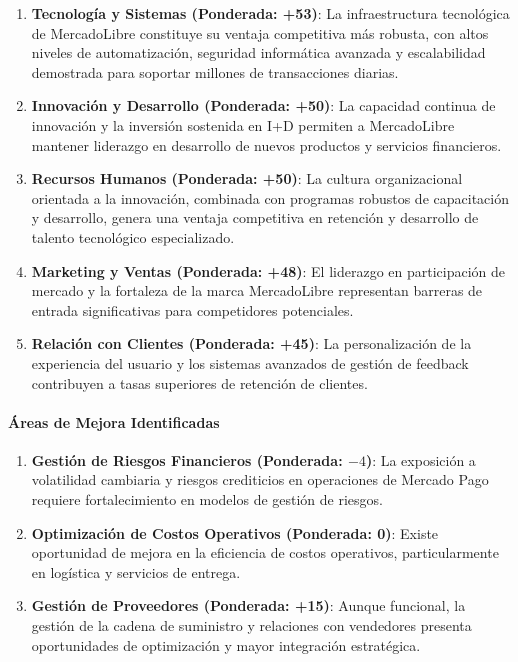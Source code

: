 \begin{enumerate}
\item \textbf{Tecnología y Sistemas (Ponderada: +53)}: La infraestructura tecnológica de MercadoLibre constituye su ventaja competitiva más robusta, con altos niveles de automatización, seguridad informática avanzada y escalabilidad demostrada para soportar millones de transacciones diarias.

\item \textbf{Innovación y Desarrollo (Ponderada: +50)}: La capacidad continua de innovación y la inversión sostenida en I+D permiten a MercadoLibre mantener liderazgo en desarrollo de nuevos productos y servicios financieros.

\item \textbf{Recursos Humanos (Ponderada: +50)}: La cultura organizacional orientada a la innovación, combinada con programas robustos de capacitación y desarrollo, genera una ventaja competitiva en retención y desarrollo de talento tecnológico especializado.

\item \textbf{Marketing y Ventas (Ponderada: +48)}: El liderazgo en participación de mercado y la fortaleza de la marca MercadoLibre representan barreras de entrada significativas para competidores potenciales.

\item \textbf{Relación con Clientes (Ponderada: +45)}: La personalización de la experiencia del usuario y los sistemas avanzados de gestión de feedback contribuyen a tasas superiores de retención de clientes.
\end{enumerate}

\paragraph{Áreas de Mejora Identificadas}

\begin{enumerate}
\item \textbf{Gestión de Riesgos Financieros (Ponderada: $-4$)}: La exposición a volatilidad cambiaria y riesgos crediticios en operaciones de Mercado Pago requiere fortalecimiento en modelos de gestión de riesgos.

\item \textbf{Optimización de Costos Operativos (Ponderada: 0)}: Existe oportunidad de mejora en la eficiencia de costos operativos, particularmente en logística y servicios de entrega.

\item \textbf{Gestión de Proveedores (Ponderada: +15)}: Aunque funcional, la gestión de la cadena de suministro y relaciones con vendedores presenta oportunidades de optimización y mayor integración estratégica.
\end{enumerate}

